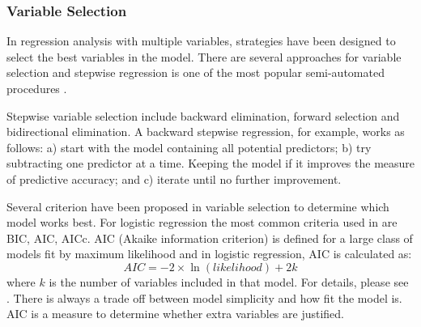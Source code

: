 \documentclass[12pt,english]{report}
\begin{document}

\subsubsection{Variable Selection}
In regression analysis with multiple variables, strategies have been designed
to select the best variables in the model. There are several approaches for
variable selection and stepwise regression is one of the most popular
semi-automated procedures \citep{Han2011}.


Stepwise variable selection include backward elimination, forward selection and
bidirectional elimination. A backward stepwise regression, for example, works
as follows: a) start with the model containing all potential predictors; b) try
subtracting one predictor at a time. Keeping the model if it improves the
measure of predictive accuracy; and c) iterate until no further improvement.

Several criterion have been proposed in variable selection to determine which
model works best. For logistic regression the most common criteria used in  are
BIC, AIC, AICc.  AIC (Akaike information criterion) is defined for a large
class of models fit by maximum likelihood and in logistic regression, AIC is
calculated as:
\begin{equation}
	AIC= -2 \times \ln(likelihood) + 2k
\end{equation}
where $k$ is the number of variables included in that model. For details,
please see  \citep{Han2011}. There is always a trade off between model
simplicity and how fit the model is. AIC is a measure to determine whether
extra variables are justified.
 	
\end{document}
